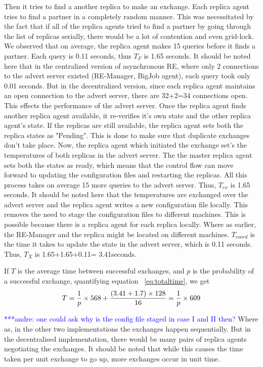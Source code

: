 \documentclass{rspublic}
\newcommand{\alnote}[1]{ {\textcolor{blue} { ***andre: #1 }}}
\newcommand{\alnote}[1]{}
\begin{document}
Then it tries to find a another replica to make an exchange. Each
replica agent tries to find a partner in a completely random
manner. This was necessitated by the fact that if all of the replica
agents tried to find a partner by going through the list of replicas
serially, there would be a lot of contention and even grid-lock. We
observed that on average, the replica agent makes 15 queries before it
finds a partner. Each query is 0.11 seconds, thus $T_F$ is 1.65
seconds. It should be noted here that in the centralized version of
asynchronous RE, where only 2 connections to the advert server existed
(RE-Manager, BigJob agent), each query took only 0.01 seconds. But in
the decentralized version, since each replica agent maintains an open
connection to the advert server, there are 32+2=34 connections
open. This effects the performance of the advert server. Once the
replica agent finds another replica agent available, it re-verifies
it's own state and the other replica agent's state. If the replicas
are still available, the replica agent sets both the replica states as
"Pending". This is done to make sure that duplicate exchanges don't
take place. Now, the replica agent which initiated the exchange set's
the temperatures of both replicas in the advert server. The the master
replica agent sets both the states as ready, which means that the
control flow can move forward to updating the configuration files and
restarting the replicas. All this process takes on average 15 more
queries to the advert server. Thus, $T_{ex}$ is 1.65 seconds. It
should be noted here that the temperatures are exchanged over the
advert server and the replica agent writes a new configuration file
locally. This removes the need to stage the configuration files to
different machines. This is possible because there is a replica agent
for each replica locally. Where as earlier, the RE-Manager and the
replica might be located on different machines. $T_{coord}$ is the
time it takes to update the state in the advert server, which is 0.11
seconds. Thus, $T_X$ is 1.65+1.65+0.11= 3.41seconds.

If $T$ is the average time between successful exchanges, and $p$ is
the probability of a successful exchange, quantifying equation
~\ref{eq:totaltime}, we get
\begin{eqnarray}
T=  {1 \over p} \times {568 + {(3.41+1.7)\times 128\over 16}} = {1 \over p} \times 609
\label{eq:timebt}
\end{eqnarray}


\alnote {one could ask why is the config file staged in case I and II
  then?}  Where as, in the other two implementations the exchanges
happen sequentially. But in the decentralised implementation, there
would be many pairs of replica agents negotiating the exchanges. It
should be noted that while this causes the time taken per unit
exchange to go up, more exchanges occur in unit time.
\end{document}

